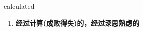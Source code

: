 
\begin{frame}
{\huge calculated}
\begin{center}
\begin{enumerate}\Large
  \item \textbf{经过计算(成败得失)的，经过深思熟虑的}
\end{enumerate}
\end{center}
\end{frame}
